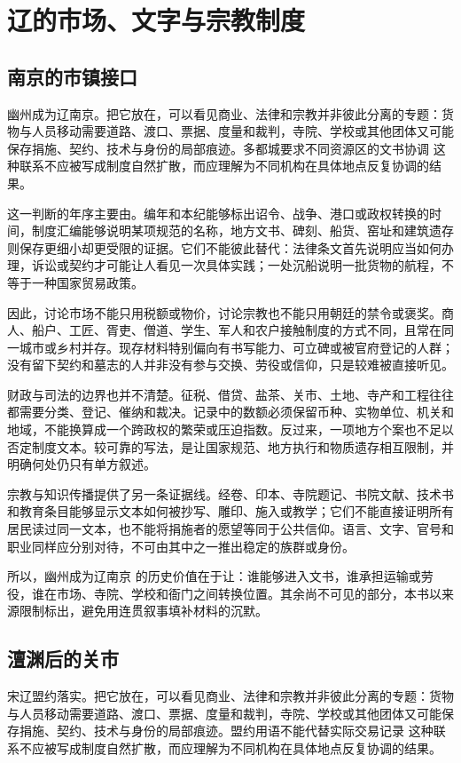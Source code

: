 \section{辽的市场、文字与宗教制度}

\subsection{南京的市镇接口}

幽州成为辽南京。把它放在，可以看见商业、法律和宗教并非彼此分离的专题：货物与人员移动需要道路、渡口、票据、度量和裁判，寺院、学校或其他团体又可能保存捐施、契约、技术与身份的局部痕迹。多都城要求不同资源区的文书协调 这种联系不应被写成制度自然扩散，而应理解为不同机构在具体地点反复协调的结果。

这一判断的年序主要由。编年和本纪能够标出诏令、战争、港口或政权转换的时间，制度汇编能够说明某项规范的名称，地方文书、碑刻、船货、窑址和建筑遗存则保存更细小却更受限的证据。它们不能彼此替代：法律条文首先说明应当如何办理，诉讼或契约才可能让人看见一次具体实践；一处沉船说明一批货物的航程，不等于一种国家贸易政策。

因此，讨论市场不能只用税额或物价，讨论宗教也不能只用朝廷的禁令或褒奖。商人、船户、工匠、胥吏、僧道、学生、军人和农户接触制度的方式不同，且常在同一城市或乡村并存。现存材料特别偏向有书写能力、可立碑或被官府登记的人群；没有留下契约和墓志的人并非没有参与交换、劳役或信仰，只是较难被直接听见。

财政与司法的边界也并不清楚。征税、借贷、盐茶、关市、土地、寺产和工程往往都需要分类、登记、催纳和裁决。记录中的数额必须保留币种、实物单位、机关和地域，不能换算成一个跨政权的繁荣或压迫指数。反过来，一项地方个案也不足以否定制度文本。较可靠的写法，是让国家规范、地方执行和物质遗存相互限制，并明确何处仍只有单方叙述。

宗教与知识传播提供了另一条证据线。经卷、印本、寺院题记、书院文献、技术书和教育条目能够显示文本如何被抄写、雕印、施入或教学；它们不能直接证明所有居民读过同一文本，也不能将捐施者的愿望等同于公共信仰。语言、文字、官号和职业同样应分别对待，不可由其中之一推出稳定的族群或身份。

所以，幽州成为辽南京 的历史价值在于让：谁能够进入文书，谁承担运输或劳役，谁在市场、寺院、学校和衙门之间转换位置。其余尚不可见的部分，本书以来源限制标出，避免用连贯叙事填补材料的沉默。

\subsection{澶渊后的关市}

宋辽盟约落实。把它放在，可以看见商业、法律和宗教并非彼此分离的专题：货物与人员移动需要道路、渡口、票据、度量和裁判，寺院、学校或其他团体又可能保存捐施、契约、技术与身份的局部痕迹。盟约用语不能代替实际交易记录 这种联系不应被写成制度自然扩散，而应理解为不同机构在具体地点反复协调的结果。

